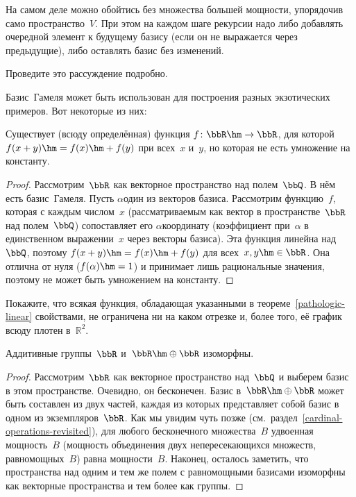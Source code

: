 На самом деле можно обойтись без множества большей мощности,
упорядочив само пространство~$V$. При этом на каждом шаге
рекурсии надо либо добавлять очередной элемент к будущему
базису (если он не выражается через предыдущие), либо оставлять
базис без изменений.

\begin{problem}
        \label{hamel-alternative}
Проведите это рассуждение подробно.
\end{problem}

\problskip
Базис~Гамеля может быть использован для построения разных
экзотических примеров. Вот некоторые из них:

\begin{theorem}\label{pathologic-linear}
Существует (всюду определённая) функция $f\colon \bbR\hm\to\bbR$, для которой
$f(x+y)\hm=f(x)\hm+f(y)$ при всех~$x$ и~$y$, но которая не есть
умножение на константу.
\end{theorem}

\begin{proof}
Рассмотрим~$\bbR$ как векторное пространство над полем~$\bbQ$.
В нём есть базис~Гамеля. Пусть $\alpha$\т один
из векторов базиса. Рассмотрим функцию~$f$, которая с
каждым числом~$x$ (рассматриваемым как вектор в пространстве~$\bbR$
над полем~$\bbQ$) сопоставляет его
$\alpha$\д координату (коэффициент при~$\alpha$ в единственном
выражении~$x$ через векторы базиса). Эта функция линейна
над~$\bbQ$, поэтому $f(x+y)\hm=f(x)\hm+f(y)$ для всех~$x,y\hm\in\bbR$.
Она отлична
от нуля ($f(\alpha)\hm=1$) и
принимает лишь рациональные значения, поэтому не может быть
умножением на константу.
\end{proof}

\begin{problem}
Покажите, что всякая функция, обладающая указанными в
теореме~\ref{pathologic-linear} свойствами, не ограничена ни на
каком отрезке и, более того, её график всюду плотен в~$\mathbb{R}^2$.
\end{problem}

\problskip
\begin{theorem}
        \label{r-plus-r}%
Аддитивные группы~$\bbR$ и~$\bbR\hm\oplus\bbR$
изоморфны.
\end{theorem}

\begin{proof}
Рассмотрим~$\bbR$ как векторное пространство над~$\bbQ$ и
выберем базис в этом пространстве. Очевидно, он бесконечен.
Базис в~$\bbR\hm\oplus\bbR$ может быть
составлен из двух частей, каждая из которых представляет собой
базис в одном из экземпляров~$\bbR$.
Как мы увидим чуть позже
(см.~раздел~\ref{cardinal-operations-revisited}), для любого
бесконечного множества~$B$ удвоенная мощность~$B$ (мощность
объединения двух непересекающихся множеств, равномощных~$B$)
равна мощности~$B$.
Наконец, осталось заметить,
что пространства над одним и тем же
полем с равномощными базисами изоморфны как векторные пространства и
тем более как группы.
\end{proof}

